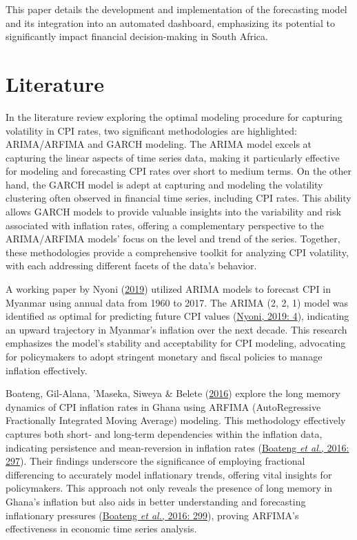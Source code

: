 \documentclass[11pt,preprint, authoryear]{elsarticle}
\numberwithin{equation}{section}
\numberwithin{figure}{section}
\numberwithin{table}{section}
\begin{document}
This paper details the development and implementation of the forecasting
model and its integration into an automated dashboard, emphasizing its
potential to significantly impact financial decision-making in South
Africa.

\hypertarget{literature}{%
\section{\texorpdfstring{Literature
\label{Lit}}{Literature }}\label{literature}}

In the literature review exploring the optimal modeling procedure for
capturing volatility in CPI rates, two significant methodologies are
highlighted: ARIMA/ARFIMA and GARCH modeling. The ARIMA model excels at
capturing the linear aspects of time series data, making it particularly
effective for modeling and forecasting CPI rates over short to medium
terms. On the other hand, the GARCH model is adept at capturing and
modeling the volatility clustering often observed in financial time
series, including CPI rates. This ability allows GARCH models to provide
valuable insights into the variability and risk associated with
inflation rates, offering a complementary perspective to the
ARIMA/ARFIMA models' focus on the level and trend of the series.
Together, these methodologies provide a comprehensive toolkit for
analyzing CPI volatility, with each addressing different facets of the
data's behavior.

A working paper by Nyoni (\protect\hyperlink{ref-Nyoni2019}{2019})
utilized ARIMA models to forecast CPI in Myanmar using annual data from
1960 to 2017. The ARIMA (2, 2, 1) model was identified as optimal for
predicting future CPI values (\protect\hyperlink{ref-Nyoni2019}{Nyoni,
2019: 4}), indicating an upward trajectory in Myanmar's inflation over
the next decade. This research emphasizes the model's stability and
acceptability for CPI modeling, advocating for policymakers to adopt
stringent monetary and fiscal policies to manage inflation effectively.

Boateng, Gil-Alana, 'Maseka, Siweya \& Belete
(\protect\hyperlink{ref-Boateng2016}{2016}) explore the long memory
dynamics of CPI inflation rates in Ghana using ARFIMA (AutoRegressive
Fractionally Integrated Moving Average) modeling. This methodology
effectively captures both short- and long-term dependencies within the
inflation data, indicating persistence and mean-reversion in inflation
rates (\protect\hyperlink{ref-Boateng2016}{Boateng \emph{et al.}, 2016:
297}). Their findings underscore the significance of employing
fractional differencing to accurately model inflationary trends,
offering vital insights for policymakers. This approach not only reveals
the presence of long memory in Ghana's inflation but also aids in better
understanding and forecasting inflationary pressures
(\protect\hyperlink{ref-Boateng2016}{Boateng \emph{et al.}, 2016: 299}),
proving ARFIMA's effectiveness in economic time series analysis.
\end{document}
